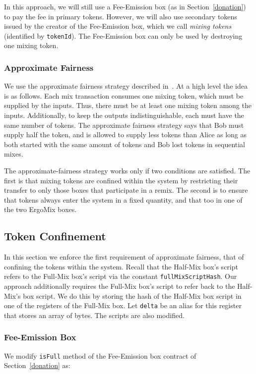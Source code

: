 \documentclass[11pt]{article}
\newcommand{\mixname}{ErgoMix\xspace}
\begin{document}
In this approach, we will still use a Fee-Emission box (as in Section~\ref{donation}) to pay the fee in primary tokens. However, we will also use secondary tokens issued by the creator of the Fee-Emission box, which we call {\em mixing tokens} (identified by \texttt{tokenId}). The Fee-Emission box can only be used by destroying one mixing token.

\subsubsection{Approximate Fairness}

We use the approximate fairness strategy described in~\cite{advtutorial}. At a high level the idea is as follows.
Each mix transaction consumes one mixing token, which must be supplied by the inputs. Thus, there must be at least one mixing token among the inputs. Additionally, to keep the outputs indistinguishable, each must have the same number of tokens. The approximate fairness strategy says that Bob must supply half the token, and is allowed to supply less tokens than Alice as long as both started with the same amount of tokens and Bob lost tokens in sequential mixes.

The approximate-fairness strategy works only if two conditions are satisfied. The first is that mixing tokens are confined within the system by restricting their transfer to only those boxes that participate in a remix. 
The second is to ensure that tokens always enter the system in a fixed quantity, and that too in one of the two \mixname boxes. 

\subsection{Token Confinement}

In this section we enforce the first requirement of approximate fairness, that of confining the tokens within the system. 
Recall that the Half-Mix box's script refers to the Full-Mix box's script via the constant \texttt{fullMixScriptHash}. Our approach additionally requires the Full-Mix box's script to refer back to the Half-Mix's box script. We do this by storing the hash of the Half-Mix box script in one of the registers of the Full-Mix box. Let \texttt{delta} be an alias for this register that stores an array of bytes. The scripts are also modified.

\subsubsection{Fee-Emission Box}
We modify \texttt{isFull} method of the Fee-Emission box contract of Section~\ref{donation} as:
\end{document}
